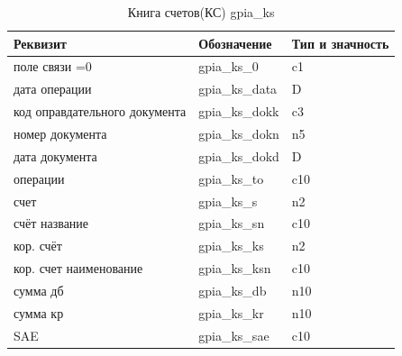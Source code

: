 \begin{table}[h!p]
    \centering
    \scriptsize
    \caption{Книга счетов(КС) gpia\_ks}
    \begin{tabular}{|l|l|l|} 

                                                                                   \hline
\textbf{Реквизит}           &\textbf{Обозначение}   &\textbf{Тип и значность}   \\ \hline
поле связи  =0              &gpia\_ks\_0      &c1                                 \\ \hline
дата операции               &gpia\_ks\_data   &D                                  \\ \hline
код оправдательного документа&gpia\_ks\_dokk  &c3                                 \\ \hline
номер документа             &gpia\_ks\_dokn   &n5                                 \\ \hline
дата документа              &gpia\_ks\_dokd   &D                                  \\ \hline
операции                    &gpia\_ks\_to     &c10                                \\ \hline
счет                        &gpia\_ks\_s      &n2                                 \\ \hline
счёт название               &gpia\_ks\_sn     &c10                                \\ \hline
кор. счёт                   &gpia\_ks\_ks     &n2                                 \\ \hline
кор. счет наименование      &gpia\_ks\_ksn    &c10                                \\ \hline
сумма дб                    &gpia\_ks\_db     &n10                                \\ \hline
сумма кр                    &gpia\_ks\_kr     &n10                                \\ \hline
SAE                         &gpia\_ks\_sae    &c10                                \\ \hline

    \end{tabular}
\end{table}

